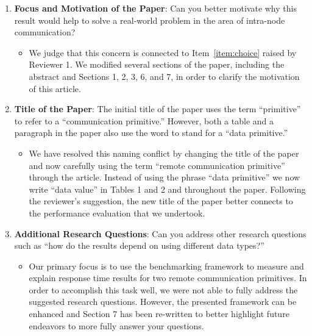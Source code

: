 \documentclass[11pt]{article}
\begin{document}
\begin{enumerate}

  \item {\bf Focus and Motivation of the Paper}: Can you better
    motivate why this result would help to solve a real-world problem
    in the area of intra-node communication?  

    \begin{itemize}
      
      \item We judge that this concern is connected to
        Item~\ref{item:choice} raised by Reviewer 1.  We modified
        several sections of the paper, including the abstract and
        Sections 1, 2, 3, 6, and 7, in order to clarify the motivation
        of this article.

    \end{itemize}

  \item {\bf Title of the Paper}: The initial title of the paper uses
    the term ``primitive'' to refer to a ``communication primitive.''
    However, both a table and a paragraph in the paper also use the
    word to stand for a ``data primitive.''

    \begin{itemize}
      
      \item We have resolved this naming conflict by changing the
        title of the paper and now carefully using the term ``remote
        communication primitive'' through the article.  Instead of
        using the phrase ``data primitive'' we now write ``data
        value'' in Tables 1 and 2 and throughout the paper.  Following
        the reviewer's suggestion, the new title of the paper better
        connects to the performance evaluation that we undertook.

    \end{itemize}

  \item {\bf Additional Research Questions}: Can you address other
    research questions such as ``how do the results depend on using
    different data types?''

    \begin{itemize}
      
      \item Our primary focus is to use the benchmarking framework to
        measure and explain response time results for two remote
        communication primitives.  In order to accomplish this task
        well, we were not able to fully address the suggested research
        questions.  However, the presented framework can be enhanced
        and Section 7 has been re-written to better highlight future
        endeavors to more fully answer your questions.


\end{itemize}
\end{enumerate}
\end{document}
